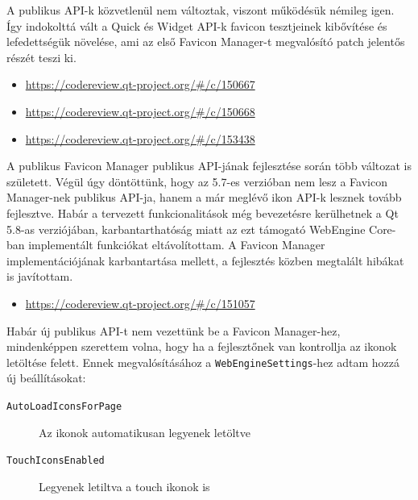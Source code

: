 \documentclass[12pt]{report}
\let\origurl\url
\renewcommand{\url}[1]{%
    \textcolor{blue}{\origurl{#1}}
}
\newcommand{\gerrit}[1]{%
    \textcolor{qtgreen}{\origurl{https://codereview.qt-project.org/\#/c/#1}}
}
\begin{document}
A publikus API-k közvetlenül nem változtak, viszont működésük némileg igen. Így indokolttá
vált a Quick és Widget API-k favicon tesztjeinek kibővítése és lefedettségük növelése, ami
az első Favicon Manager-t megvalósító patch jelentős részét teszi ki.

\begin{center}
    \begin{reviewbox}
        \begin{itemize}
            \renewcommand{\labelitemi}{\textcolor{qtgreen}{$\blacktriangleright$}}
            \item \gerrit{150667}
            \item \gerrit{150668}
            \item \gerrit{153438}
        \end{itemize}
    \end{reviewbox}
\end{center}

A publikus Favicon Manager publikus API-jának fejlesztése során több változat is született.
Végül úgy döntöttünk, hogy az 5.7-es verzióban nem lesz a Favicon Manager-nek publikus
API-ja, hanem a már meglévő ikon API-k lesznek tovább fejlesztve. Habár a tervezett
funkcionalitások még bevezetésre kerülhetnek a Qt 5.8-as verziójában, karbantarthatóság
miatt az ezt támogató WebEngine Core-ban implementált funkciókat eltávolítottam.
A Favicon Manager implementációjának karbantartása mellett, a fejlesztés közben megtalált
hibákat is javítottam.

\begin{center}
    \begin{reviewbox}
        \begin{itemize}
            \renewcommand{\labelitemi}{\textcolor{qtgreen}{$\blacktriangleright$}}
            \item \gerrit{151057}
        \end{itemize}
    \end{reviewbox}
\end{center}

Habár új publikus API-t nem vezettünk be a Favicon Manager-hez, mindenképpen szerettem volna,
hogy ha a fejlesztőnek van kontrollja az ikonok letöltése felett. Ennek megvalósításához
a \texttt{WebEngineSettings}-hez adtam hozzá új beállításokat:
\begin{description}
    \item[\texttt{AutoLoadIconsForPage}] Az ikonok automatikusan legyenek letöltve
    \item[\texttt{TouchIconsEnabled}] Legyenek letiltva a touch ikonok is
\end{description}
\end{document}
